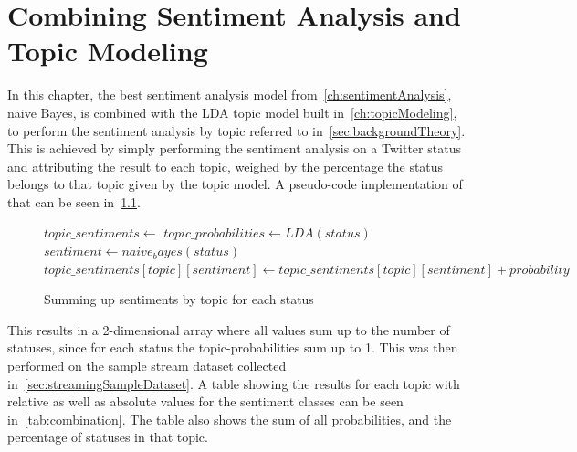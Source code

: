 \chapter{Combining Sentiment Analysis and Topic Modeling}
\label{ch:combiningSentimentAnalysisAndTopicModeling}


In this chapter, the best sentiment analysis model from~\cref{ch:sentimentAnalysis}, naive Bayes,
is combined with the LDA topic model built in~\cref{ch:topicModeling},
to perform the sentiment analysis by topic referred to in~\cref{sec:backgroundTheory}.
\\
This is achieved by simply performing the sentiment analysis on a Twitter status and attributing the result to each topic,
weighed by the percentage the status belongs to that topic given by the topic model.
A pseudo-code implementation of that can be seen in~\cref{pseudo_code:sentiment_topic_summing}.

\begin{figure}
    \caption{Summing up sentiments by topic for each status}
    \label{pseudo_code:sentiment_topic_summing}
    \begin{algorithmic}
        \State $topic\_sentiments \gets {}$ %
            \State $topic\_probabilities \gets LDA(status)$
            \State $sentiment \gets naive_bayes(status)$
                \State $topic\_sentiments[topic][sentiment]
                    \gets topic\_sentiments[topic][sentiment] + probability$
            \EndFor
        \EndFor
    \end{algorithmic}
\end{figure}

This results in a 2-dimensional array where all values sum up to the number of statuses,
since for each status the topic-probabilities sum up to 1.
This was then performed on the sample stream dataset collected in~\cref{sec:streamingSampleDataset}.
A table showing the results for each topic with relative as well as absolute values for the sentiment classes  can be seen in~\cref{tab:combination}.
The table also shows the sum of all probabilities, and the percentage of statuses in that topic.

